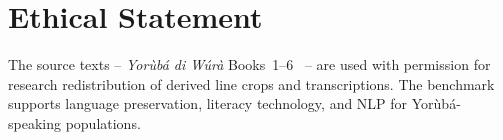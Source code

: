 \documentclass{article}
\newcommand{\Yoruba}{Yor\`ub\'a}
\begin{document}
\section*{Ethical Statement}

The source texts -- \emph{\Yoruba{} di W\'ur\`a} Books~1--6~\cite{oyedele2020ydw} -- are used with permission for research redistribution of derived line crops and transcriptions. The benchmark supports language preservation, literacy technology, and NLP for \Yoruba{}-speaking populations.



\end{document}
